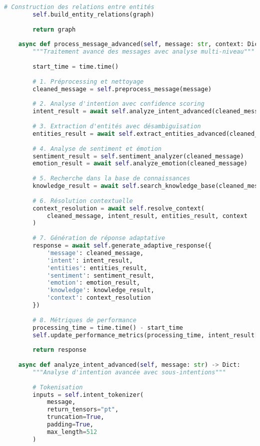 \documentclass[12pt,a4paper]{report}
\begin{document}
\begin{lstlisting}[language=Python, caption=Pipeline NLP avancé pour le chatbot]
        # Construction des relations entre entités
        self.build_entity_relations(graph)
        
        return graph
    
    async def process_message_advanced(self, message: str, context: Dict) -> Dict:
        """Traitement avancé des messages avec analyse multi-niveau"""
        
        start_time = time.time()
        
        # 1. Préprocessing et nettoyage
        cleaned_message = self.preprocess_message(message)
        
        # 2. Analyse d'intention avec confidence scoring
        intent_result = await self.analyze_intent_advanced(cleaned_message)
        
        # 3. Extraction d'entités avec désambiguïsation
        entities_result = await self.extract_entities_advanced(cleaned_message, context)
        
        # 4. Analyse de sentiment et émotion
        sentiment_result = self.sentiment_analyzer(cleaned_message)
        emotion_result = await self.analyze_emotion(cleaned_message)
        
        # 5. Recherche dans la base de connaissances
        knowledge_result = await self.search_knowledge_base(cleaned_message, intent_result)
        
        # 6. Résolution contextuelle
        context_resolution = await self.resolve_context(
            cleaned_message, intent_result, entities_result, context
        )
        
        # 7. Génération de réponse adaptative
        response = await self.generate_adaptive_response({
            'message': cleaned_message,
            'intent': intent_result,
            'entities': entities_result,
            'sentiment': sentiment_result,
            'emotion': emotion_result,
            'knowledge': knowledge_result,
            'context': context_resolution
        })
        
        # 8. Métriques de performance
        processing_time = time.time() - start_time
        self.update_performance_metrics(processing_time, intent_result['confidence'])
        
        return response
    
    async def analyze_intent_advanced(self, message: str) -> Dict:
        """Analyse d'intention avancée avec sous-intentions"""
        
        # Tokenisation
        inputs = self.intent_tokenizer(
            message,
            return_tensors="pt",
            truncation=True,
            padding=True,
            max_length=512
        )
        

\end{lstlisting}
\end{document}
